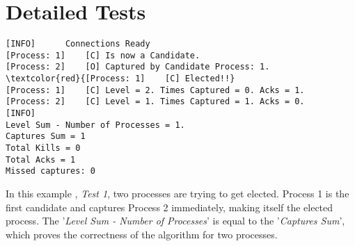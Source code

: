 \section*{Detailed Tests}		

	\vspace{10pt}

	\begin{Verbatim}[commandchars=\\\{\},codes={\catcode`$=3\catcode`_=8},frame=single,label=Test 1 output]
[INFO]	  	Connections Ready
[Process: 1]	[C]	Is now a Candidate.
[Process: 2]	[O]	Captured by Candidate Process: 1.
\textcolor{red}{[Process: 1]	[C]	Elected!!} 
[Process: 1]	[C]	Level = 2. Times Captured = 0. Acks = 1.
[Process: 2]	[C]	Level = 1. Times Captured = 1. Acks = 0.
[INFO]		
Level Sum - Number of Processes = 1.	
Captures Sum = 1	
Total Kills = 0	
Total Acks = 1
Missed captures: 0
	\end{Verbatim}

	\vspace{10pt}

	In this example , \textit{Test 1}, two processes are trying to get elected. Process 1 is the first candidate and captures Process 2 immediately, making itself the elected process. The '\textit{Level Sum - Number of Processes}' is equal to the '\textit{Captures Sum}', which proves the correctness of the algorithm for two processes.

	\vspace{10pt}
	
